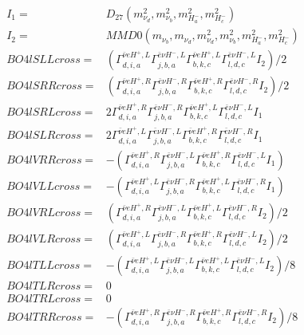 \documentclass[A4,landscape]{article}
\begin{document}
\begin{align} 
I_1 = & D_{27}(m^2_{\nu_{{d}}}, m^2_{\nu_{{b}}}, m^2_{H^-_{{a}}}, m^2_{H^-_{{c}}}) \\ 
I_2 = & MMD0(m_{\nu_{{b}}}, m_{\nu_{{d}}}, m^2_{\nu_{{d}}}, m^2_{\nu_{{b}}}, m^2_{H^-_{{a}}}, m^2_{H^-_{{c}}}) \\ 
  BO4lSLLcross= & ( \Gamma^{\bar{\nu}e H^+,L}_{d, i, a} \Gamma^{\bar{e}\nu H^- ,L}_{j, b, a} \Gamma^{\bar{\nu}e H^+,L}_{b, k, c} \Gamma^{\bar{e}\nu H^- ,L}_{l, d, c} I_2)/2 \\ 
  BO4lSRRcross= & ( \Gamma^{\bar{\nu}e H^+,R}_{d, i, a} \Gamma^{\bar{e}\nu H^- ,R}_{j, b, a} \Gamma^{\bar{\nu}e H^+,R}_{b, k, c} \Gamma^{\bar{e}\nu H^- ,R}_{l, d, c} I_2)/2 \\ 
  BO4lSRLcross= & 2  \Gamma^{\bar{\nu}e H^+,R}_{d, i, a} \Gamma^{\bar{e}\nu H^- ,R}_{j, b, a} \Gamma^{\bar{\nu}e H^+,L}_{b, k, c} \Gamma^{\bar{e}\nu H^- ,L}_{l, d, c} I_1 \\ 
  BO4lSLRcross= & 2  \Gamma^{\bar{\nu}e H^+,L}_{d, i, a} \Gamma^{\bar{e}\nu H^- ,L}_{j, b, a} \Gamma^{\bar{\nu}e H^+,R}_{b, k, c} \Gamma^{\bar{e}\nu H^- ,R}_{l, d, c} I_1 \\ 
  BO4lVRRcross= & -( \Gamma^{\bar{\nu}e H^+,R}_{d, i, a} \Gamma^{\bar{e}\nu H^- ,L}_{j, b, a} \Gamma^{\bar{\nu}e H^+,R}_{b, k, c} \Gamma^{\bar{e}\nu H^- ,L}_{l, d, c} I_1) \\ 
  BO4lVLLcross= & -( \Gamma^{\bar{\nu}e H^+,L}_{d, i, a} \Gamma^{\bar{e}\nu H^- ,R}_{j, b, a} \Gamma^{\bar{\nu}e H^+,L}_{b, k, c} \Gamma^{\bar{e}\nu H^- ,R}_{l, d, c} I_1) \\ 
  BO4lVRLcross= & ( \Gamma^{\bar{\nu}e H^+,R}_{d, i, a} \Gamma^{\bar{e}\nu H^- ,L}_{j, b, a} \Gamma^{\bar{\nu}e H^+,L}_{b, k, c} \Gamma^{\bar{e}\nu H^- ,R}_{l, d, c} I_2)/2 \\ 
  BO4lVLRcross= & ( \Gamma^{\bar{\nu}e H^+,L}_{d, i, a} \Gamma^{\bar{e}\nu H^- ,R}_{j, b, a} \Gamma^{\bar{\nu}e H^+,R}_{b, k, c} \Gamma^{\bar{e}\nu H^- ,L}_{l, d, c} I_2)/2 \\ 
  BO4lTLLcross= & -( \Gamma^{\bar{\nu}e H^+,L}_{d, i, a} \Gamma^{\bar{e}\nu H^- ,L}_{j, b, a} \Gamma^{\bar{\nu}e H^+,L}_{b, k, c} \Gamma^{\bar{e}\nu H^- ,L}_{l, d, c} I_2)/8 \\ 
  BO4lTLRcross= & 0 \\ 
  BO4lTRLcross= & 0 \\ 
  BO4lTRRcross= & -( \Gamma^{\bar{\nu}e H^+,R}_{d, i, a} \Gamma^{\bar{e}\nu H^- ,R}_{j, b, a} \Gamma^{\bar{\nu}e H^+,R}_{b, k, c} \Gamma^{\bar{e}\nu H^- ,R}_{l, d, c} I_2)/8 \\ 
\end{align} 
\end{document}
